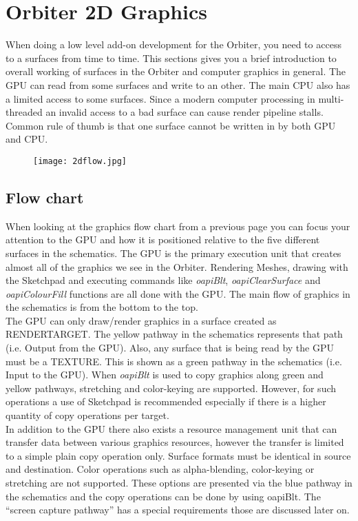 \documentclass[Orbiter Developer Manual.tex]{subfiles}
\begin{document}
\section{Orbiter 2D Graphics}
When doing a low level add-on development for the Orbiter, you need to access to a surfaces from time to time. This sections gives you a brief introduction to overall working of surfaces in the Orbiter and computer graphics in general. The GPU can read from some surfaces and write to an other. The main CPU also has a limited access to some surfaces. Since a modern computer processing in multi-threaded an invalid access to a bad surface can cause render pipeline stalls. Common rule of thumb is that one surface cannot be written in by both GPU and CPU.\\

\begin{figure}[H]
  \centering
  \texttt{[image: 2dflow.jpg]}
\end{figure}

\subsection{Flow chart}
When looking at the graphics flow chart from a previous page you can focus your attention to the GPU and how it is positioned relative to the five different surfaces in the schematics. The GPU is the primary execution unit that creates almost all of the graphics we see in the Orbiter. Rendering Meshes, drawing with the Sketchpad and executing commands like \textit{oapiBlt}, \textit{oapiClearSurface} and \textit{oapiColourFill} functions are all done with the GPU. The main flow of graphics in the schematics is from the bottom to the top.\\

The GPU can only draw/render graphics in a surface created as \textsc{RENDERTARGET}. The yellow pathway in the schematics represents that path (i.e. Output from the GPU). Also, any surface that is being read by the GPU must be a \textsc{TEXTURE}. This is shown as a green pathway in the schematics (i.e. Input to the GPU). When \textit{oapiBlt} is used to copy graphics along green and yellow pathways, stretching and color-keying are supported. However, for such operations a use of Sketchpad is recommended especially if there is a higher quantity of copy operations per target.\\

In addition to the GPU there also exists a resource management unit that can transfer data between various graphics resources, however the transfer is limited to a simple plain copy operation only. Surface formats must be identical in source and destination. Color operations such as alpha-blending, color-keying or stretching are not supported. These options are presented via the blue pathway in the schematics and the copy operations can be done by using oapiBlt. The “screen capture pathway” has a special requirements those are discussed later on.\\
\end{document}
